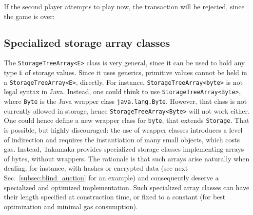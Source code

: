 If the second player attempts to play now, the transaction will be rejected, since the game is over:
%

\subsection{Specialized storage array classes}\label{subsec:specialized_storage_array_classes}

The \texttt{StorageTreeArray<E>} class is very general, since it can be used to hold
any type \texttt{E} of storage values. Since it uses generics,
primitive values cannot be held in a \texttt{StorageTreeArray<E>}, directly.
For instance, \texttt{StorageTreeArray<byte>} is not legal syntax in Java.
Instead, one could think to use \texttt{StorageTreeArray<Byte>}, where \texttt{Byte}
is the Java wrapper class \texttt{java.lang.Byte}. However, that class is not
currently allowed in storage, hence \texttt{StorageTreeArray<Byte>} will not work either.
One could hence define a new wrapper class for \texttt{byte}, that extends \texttt{Storage}.
That is possible, but highly discouraged:
the use of wrapper classes introduces a level of indirection
and requires the instantiation of many small objects, which costs gas. Instead,
Takamaka provides specialized storage classes implementing arrays of bytes,
without wrappers. The rationale is that such arrays arise
naturally when dealing, for instance, with hashes or encrypted data
(see next Sec.~\ref{subsec:blind_auction} for an example) and consequently deserve
a specialized and optimized implementation.
Such specialized array classes
can have their length specified at construction time, or fixed to
a constant (for best optimization and minimal gas consumption).

